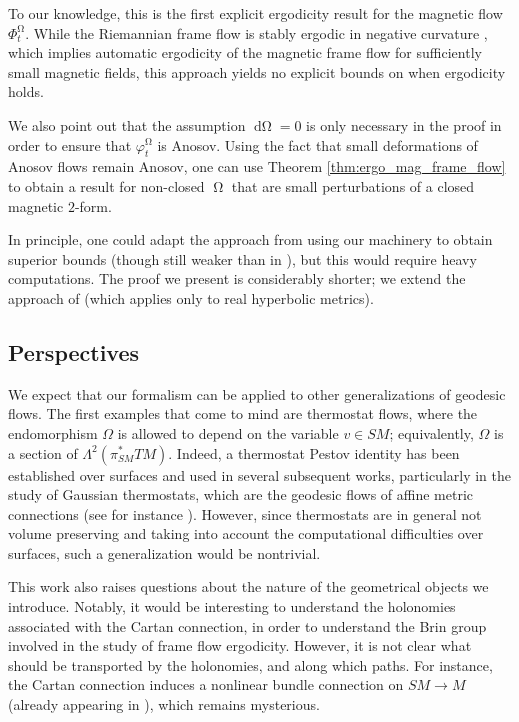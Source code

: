 \documentclass[12pt]{amsart}
\numberwithin{numbering}{section}
\theoremstyle{plain}
\theoremstyle{definition}
\theoremstyle{remark}
\numberwithin{equation}{section}
\DeclareMathOperator{\mg}{\Omega}
\DeclareMathOperator{\dmg}{d\Omega}
\newcommand{\psm}{\pi_{SM}}
\begin{document}
To our knowledge, this is the first explicit ergodicity result for the magnetic flow $\Phi_t^{\mg}$. While the Riemannian frame flow is stably ergodic in negative curvature \cite{burns2003stable}, which implies automatic ergodicity of the magnetic frame flow for sufficiently small magnetic fields, this approach yields no explicit bounds on when ergodicity holds.

We also point out that the assumption $\dmg = 0$ is only necessary in the proof in order to ensure that $\varphi_t^{\mg}$ is Anosov. Using the fact that small deformations of Anosov flows remain Anosov, one can use Theorem \ref{thm:ergo_mag_frame_flow} to obtain a result for non-closed $\mg$ that are small perturbations of a closed magnetic $2$-form.

\smallskip 

In principle, one could adapt the approach from \cite{cekic2024frame} using our machinery to obtain superior bounds (though still weaker than in \cite{cekic2024frame}), but this would require heavy computations. The proof we present is considerably shorter; we extend the approach of \cite{cekic2025pestov} (which applies only to real hyperbolic metrics).

\subsection{Perspectives}

We expect that our formalism can be applied to other generalizations of geodesic flows. The first examples that come to mind are thermostat flows, where the endomorphism $\Omega$ is allowed to depend on the variable $v \in SM$; equivalently, $\Omega$ is a section of $\Lambda^2(\psm^* TM)$. Indeed, a thermostat Pestov identity has been established over surfaces \cite{merry2011inverse} and used in several subsequent works, particularly in the study of Gaussian thermostats, which are the geodesic flows of affine metric connections (see for instance \cite{echevarria2025rigidity}). However, since thermostats are in general not volume preserving and taking into account the computational difficulties over surfaces, such a generalization would be nontrivial.

\medskip

This work also raises questions about the nature of the geometrical objects we introduce. Notably, it would be interesting to understand the holonomies associated with the Cartan connection, in order to understand the Brin group involved in the study of frame flow ergodicity. However, it is not clear what should be transported by the holonomies, and along which paths. For instance, the Cartan connection induces a nonlinear bundle connection on $SM \to M$ (already appearing in \cite{assenza2025hopf}), which remains mysterious.
\end{document}
